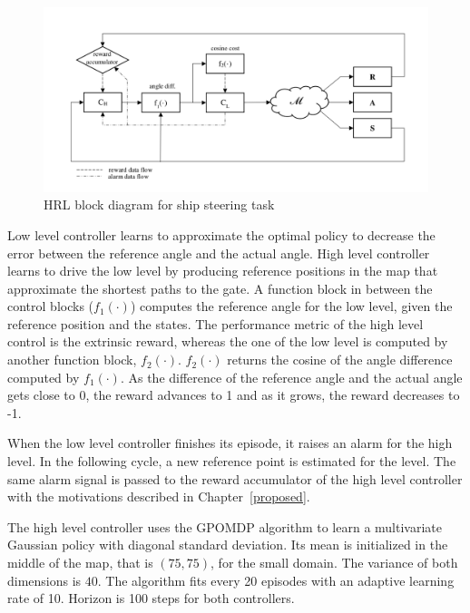 \begin{figure}[t] 
      \centering
      \includegraphics[width = \textwidth]{./pictures/blockdiagramshipsteering.png}
      \caption{HRL block diagram for ship steering task}
      \label{fig:blockdiagramship}
\end{figure} 

Low level controller learns to approximate the optimal policy to decrease the error between the reference angle and the actual angle.  High level controller learns to drive the low level by producing reference positions in the map that approximate the shortest paths to the gate. A function block in between the control blocks ($f_1( \cdot )$) computes the reference angle for the low level, given the reference position and the states. The performance metric of the high level control is the extrinsic reward, whereas the one of the low level is computed by another function block, $f_2( \cdot )$. $f_2( \cdot )$ returns the cosine of the angle difference computed by $f_1( \cdot )$. As the difference of the reference angle and the actual angle gets close to 0, the reward advances to 1 and as it grows, the reward decreases to -1. 

When the low level controller finishes its episode, it raises an alarm for the high level. In the following cycle, a new reference point is estimated for the level. The same alarm signal is passed to the reward accumulator of the high level controller with the motivations described in Chapter~\ref{proposed}. 

The high level controller uses the GPOMDP algorithm to learn a multivariate Gaussian policy with diagonal standard deviation. Its mean is initialized in the middle of the map, that is $(75, 75)$, for the small domain. The variance of both dimensions is $40$. The algorithm fits every 20 episodes with an adaptive learning rate of 10. Horizon is 100 steps for both controllers.

